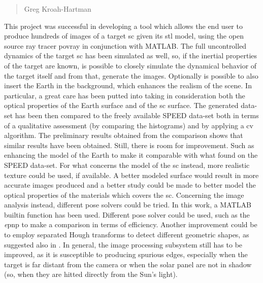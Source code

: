 \begin{quotation}
{\footnotesize
{}
\begin{flushright}
Greg Kroah-Hartman
\end{flushright}
}
\end{quotation}
\vspace{0.5cm}

This project was successful in developing a tool which allows the end user to produce hundreds of images of a target \acrshort{sc} given its \acrshort{stl} model, using the open source ray tracer \acrshort{povray} in conjunction with MATLAB. The full uncontrolled dynamics of the target \acrshort{sc} has been simulated as well, so, if the inertial properties of the target are known, is possible to closely simulate the dynamical behavior of the target itself and from that, generate the images. Optionally is possible to also insert the Earth in the background, which enhances the realism of the scene. In particular, a great care has been putted into taking in consideration both the optical properties of the Earth surface and of the \acrshort{sc} surface.
The generated data-set has been then compared to the freely available SPEED data-set both in terms of a qualitative assessment (by comparing the histograms) and by applying a \acrshort{cv} algorithm.
The preliminary results obtained from the comparison shows that similar results have been obtained.
Still, there is room for improvement. Such as enhancing the model of the Earth to make it comparable with what found on the SPEED data-set. For what concerns the model of the \acrshort{sc} instead, more realistic texture could be used, if available. A better modeled surface would result in more accurate images produced and a better study could be made to better model the optical properties of the materials which covers the \acrshort{sc}.
Concerning the image analysis instead, different pose solvers could be tried. In this work, a MATLAB builtin function has been used. Different pose solver could be used, such as the \textit{e}\acrshort{pnp} \cite{10.1007/s11263-008-0152-6} to make a comparison in terms of efficiency. Another improvement could be to employ separated Hough transforms to detect different geometric shapes, as suggested also in \cite{Sharma2018}. In general, the image processing subsystem still has to be improved, as it is susceptible to producing spurious edges, especially when the target is far distant from the camera or when the solar panel are not in shadow (so, when they are hitted directly from the Sun's light).

